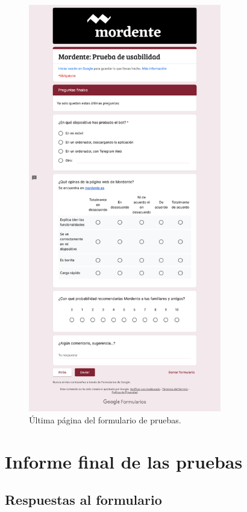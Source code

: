 \begin{figure}[h]
\centering
\includegraphics[width=0.75\textwidth]{imagenes/pruebas/form_4.png}
\caption{Última página del formulario de pruebas.}
\label{fig:form4}
\end{figure}

\section{Informe final de las pruebas}

\subsection{Respuestas al formulario}

